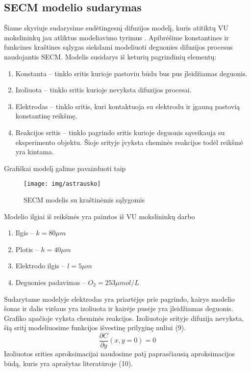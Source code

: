 \documentclass{VUMIFPSkursinis}
\begin{document}
\subsection{SECM modelio sudarymas}
Šiame skyriuje sudarysime sudėtingesnį difuzijos modelį, kuris atitiktų VU mokslininkų jau atliktus modeliavimo tyrimus \cite{Astr}.
Apibrėšime konstantines ir funkcines kraštines sąlygas siekdami modeliuoti deguonies difuzijos procesus naudojantis SECM.
Modelis susidarys iš keturių pagrindinių elementų:
\begin{enumerate}
\item{Konstanta – tinklo sritis kurioje pastoviu būdu bus pus įleidžiamas deguonis.}
\item{Izoliuota – tinklo sritis kurioje nevyksta difuzijos procesai.}
\item{Elektrodas – tinklo sritis, kuri kontaktuoja su elektrodu ir įgauną pastovią konstantinę reikšmę.}
\item{Reakcijos sritis – tinklo pagrindo sritis kurioje deguonis sąveikauja su eksperimento objektu. Šioje srityje įvyksta cheminės reakcijos todėl reikšmė yra kintama.}
\end{enumerate}
Grafiškai modelį galime pavaizduoti taip
\begin{figure}[H]
\centering
\texttt{[image: img/astrausko]}
\caption{SECM modelis su kraštinėmis sąlygomis} %
\label{img:text}
\end{figure}
Modelio ilgiai iš reikšmės yra paimtos iš VU mokslininkų darbo \cite{Astr}
\begin{enumerate}
\item{Ilgis – $k = 80\mu m$}
\item{Plotis – $h = 40\mu m$}
\item{Elektrodo ilgis – $l = 5\mu m$ }
\item{Deguonies padavimas – $O_2 = 253\mu mol/L$}
\end{enumerate}
Sudarytame modelyje elektrodas yra priartėjęs prie pagrindo, kairys modelio šonas ir dalis viršaus yra izoliuota ir kairėje pusėje yra įleidžiamas deguonis.
Grafiko apačioje vyksta cheminės reakcijos.
Izoliuotoje srityje difuzija nevyksta, šią sritį modeliuosime funkcijos išvestinę prilyginę nuliui (9).
\begin{equation}
\frac{\partial C}{\partial y}( x, y = 0) = 0
\end{equation}
Izoliuotos srities aproksimacijai naudosime patį paprasčiausią aproksimacijos būdą, kuris yra aprašytas literatūroje \cite{NumAnal} (10).
\end{document}
